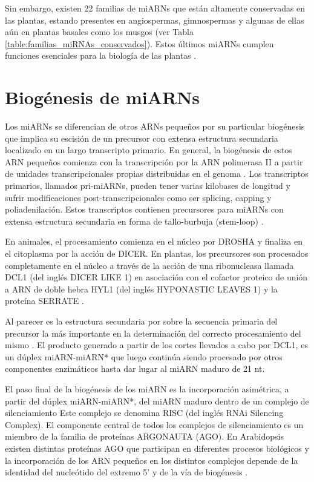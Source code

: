 Sin embargo, existen 22 familias de miARNs que están altamente conservadas en las plantas, estando presentes en angiospermas, gimnospermas y algunas de ellas aún en plantas basales como los musgos \citep{Axtell2008,Arazi2005,pmid16623887} (ver Tabla \ref{table:familias_miRNAs_conservados}).
Estos últimos miARNs cumplen funciones esenciales para la biología de las plantas \citep{Jones-Rhoades2006}.


\section{Biogénesis de miARNs}

Los miARNs se diferencian de otros ARNs pequeños por su particular biogénesis que implica su escisión de un precursor con extensa estructura secundaria localizado en un largo transcripto primario.
En general, la biogénesis de estos ARN pequeños comienza con la transcripción por la ARN polimerasa II \citep{Xie2005a} a partir de unidades transcripcionales propias distribuidas en el genoma \citep{Reinhart2002}.
Los transcriptos primarios, llamados pri-miARNs, pueden tener varias kilobases de longitud y sufrir modificaciones post-transcripcionales como ser splicing, capping y poliadenilación. 
Estos transcriptos contienen precursores para miARNs con extensa estructura secundaria en forma de tallo-burbuja (stem-loop) \citep{Jones-Rhoades2006}.

En animales, el procesamiento comienza en el núcleo por DROSHA y finaliza en el citoplasma por la acción de DICER.
En plantas, los precursores son procesados completamente en el núcleo a través de la acción de una ribonucleasa llamada DCL1 \citep{Reinhart2002,pmid12417148} (del inglés DICER LIKE 1) en asociación con el cofactor proteico de unión a ARN de doble hebra HYL1 \citep{Han2004} (del inglés HYPONASTIC LEAVES 1) y la proteína SERRATE \citep{Lobbes2006}.

Al parecer es la estructura secundaria por sobre la secuencia primaria del precursor la más importante en la determinación del correcto procesamiento del mismo \citep{Bologna11112012} .
El producto generado a partir de los cortes llevados a cabo por DCL1, es un dúplex miARN-miARN* que luego continúa siendo procesado por otros componentes enzimáticos hasta dar lugar al miARN maduro de 21 nt.

El paso final de la biogénesis de los miARN es la incorporación asimétrica, a partir del dúplex miARN-miARN*, del miARN maduro dentro de un complejo de silenciamiento
Este complejo se denomina RISC (del inglés RNAi Silencing Complex).
El componente central de todos los complejos de silenciamiento es un miembro de la familia de proteínas ARGONAUTA (AGO).
En Arabidopsis existen distintas proteínas AGO que participan en diferentes procesos biológicos \citep{Cellulaire2008} y la incorporación de los ARN pequeños en los distintos complejos depende de la identidad del nucleótido del extremo 5’ y de la vía de biogénesis \citep{pmid18342361,Montgomery2008,Takeda2008}. 

